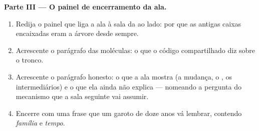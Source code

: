 \begin{problem}
\medskip\noindent\textbf{Parte III --- O painel de
encerramento da ala.}
\begin{enumerate}[resume]
  \item Redija o painel que liga a ala à sala da
         ao lado: por que as antigas caixas
        encaixadas eram a árvore desde sempre.
  \item Acrescente o parágrafo das moléculas: o que o código
        compartilhado diz sobre o tronco.
  \item Acrescente o parágrafo honesto: o que a ala mostra
        (a mudança, o , os intermediários) e o que
        ela ainda não explica --- nomeando a pergunta do
        mecanismo que a sala seguinte vai assumir.
  \item Encerre com uma frase que um garoto de doze anos vá
        lembrar, contendo \emph{família} e \emph{tempo}.
\end{enumerate}
\end{problem}
